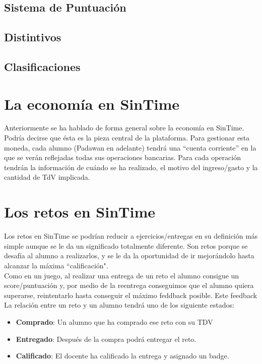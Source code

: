 \subsection{Sistema de Puntuación}

\subsection{Distintivos}

\subsection{Clasificaciones}

\section{La economía en SinTime}
Anteriormente se ha hablado de forma general sobre la economía en SinTime. Podría decirse que ésta es la pieza central de la plataforma. Para gestionar esta moneda, cada alumno (Padawan en adelante) tendrá una ``cuenta corriente'' en la que se verán reflejadas todas sus operaciones bancarias. Para cada operación tendrán la información de cuándo se ha realizado, el motivo del ingreso/gasto y la cantidad de TdV implicada.\\


\section{Los retos en SinTime}
Los retos en SinTime se podrían reducir a ejercicios/entregas en su definición más simple aunque se le da un significado totalmente diferente. Son retos porque se desafía al alumno a realizarlos, y se le da la oportunidad de ir mejorándolo hasta alcanzar la máxima ``calificación".\\

Como en un juego, al realizar una entrega de un reto el alumno consigue un score/puntuación y, por medio de la reentrega conseguimos que el alumno quiera superarse, reintentarlo hasta conseguir el máximo feddback posible. Este feedback \\

La relación entre un reto y un alumno tendrá uno de los siguiente estados:
\begin{itemize}
	\item \textbf{Comprado}: Un alumno que ha comprado ese reto con su TDV
	\item \textbf{Entregado}: Después de la compra podrá entregar el reto.
	\item \textbf{Calificado}: El docente ha calificado la entrega y asignado un badge.
\end{itemize}

